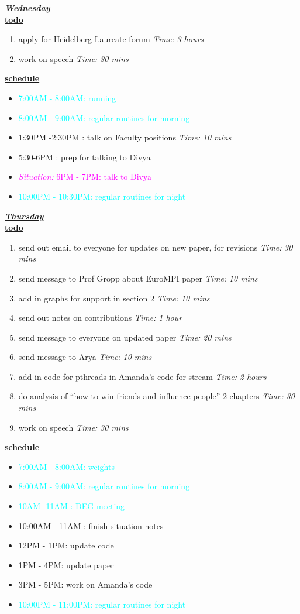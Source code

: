 \documentclass[11pt]{article}
\newcommand{\timeEst}[1]{\textit{Time:} \textit{#1}}
\newcommand{\regItem}[1]{\item \textcolor{cyan}{#1}}
\newcommand{\situationItem}[1]{\item \textcolor{magenta}{\textit{Situation:} #1}}
\begin{document}
\underline{\textbf{\textit{Wednesday}}}\\
\underline{\textbf{todo}}\\
\begin{enumerate}
\item apply for Heidelberg Laureate forum \timeEst{3 hours}
\item work on speech \timeEst{30 mins}
\end{enumerate}
\underline{\textbf{schedule}}\\
\begin{itemize}
\regItem{7:00AM - 8:00AM: running}
\regItem{8:00AM - 9:00AM: regular routines for morning}
\item 1:30PM -2:30PM : talk on Faculty positions \timeEst{10 mins}
\item 5:30-6PM : prep for talking to Divya
\situationItem {6PM - 7PM: talk to Divya}
\regItem{10:00PM - 10:30PM: regular routines for night}

\end{itemize}

\underline{\textbf{\textit{Thursday}}}\\
\underline{\textbf{todo}}\\
\begin{enumerate}
\item send out email to everyone for updates on new paper, for revisions  \timeEst{30 mins}
\item send message to Prof Gropp about EuroMPI paper \timeEst{10 mins}
\item add in graphs for support in section 2 \timeEst{10 mins}

\item send out notes on contributions \timeEst{1 hour}
\item send message to everyone on updated paper \timeEst{20 mins}
\item send message to Arya \timeEst{10 mins}

\item add in code for pthreads in Amanda's code for stream \timeEst{2 hours}

\item do analysis of ``how to win friends and influence people'' 2 chapters \timeEst{30 mins}
\item work on speech \timeEst{30 mins}
\end{enumerate}

\underline{\textbf{schedule}}\\
\begin{itemize}
\regItem{7:00AM - 8:00AM: weights}
\regItem{8:00AM - 9:00AM: regular routines for morning}
\regItem {10AM -11AM : DEG meeting}
\item 10:00AM - 11AM : finish situation notes
\item 12PM - 1PM: update code
\item 1PM - 4PM: update paper
\item 3PM - 5PM: work on Amanda's code
\regItem{10:00PM - 11:00PM: regular routines for night}
\end{itemize}
\end{document}
